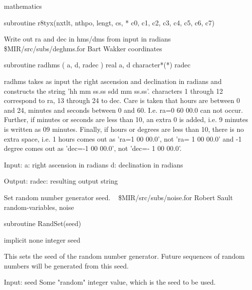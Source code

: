 \newline {} mathematics
\par{\tenpoint
{\eightpoint\begintt
      subroutine r8tyx(nxtlt, nthpo, lengt, cs,
     *                  c0, c1, c2, c3, c4, c5, c6, c7)
\endtt}
\par}
%
\noindent Write out ra and dec in hms/dms from input in radians
\newline \ 
\newline {} \$MIR/src/subs/deghms.for
\newline {} Bart Wakker
\newline {} coordinates
\par{\tenpoint
{\eightpoint\begintt
      subroutine radhms ( a, d, radec )
      real          a, d
      character*(*) radec

 radhms takes as input the right ascension and declination in radians and
 constructs the string 'hh mm ss.ss sdd mm ss.ss'.
 characters 1 through 12 correspond to ra, 13 through 24 to dec.
 Care is taken that hours are between 0 and 24, minutes and seconds between
 0 and 60. I.e. ra=0 60 00.0 can not occur.
 Further, if minutes or seconds are less than 10, an extra 0 is added, i.e.
 9 minutes is written as 09 minutes.
 Finally, if hours or degrees are less than 10, there is no extra space, i.e.
 1 hours comes out as 'ra=1 00 00.0', not 'ra= 1 00 00.0' and -1 degree comes
 out as 'dec=-1 00 00.0', not 'dec=- 1 00 00.0'.

 Input:
   a:     right ascension in radians
   d:     declination in radians

 Output:
   radec: resulting output string
\endtt}
\par}
%
\noindent Set random number generator seed.
\newline \ 
\newline {} \$MIR/src/subs/noise.for
\newline {} Robert Sault
\newline \abox{Keywords:} random-variables, noise
\par{\tenpoint
{\eightpoint\begintt
        subroutine RandSet(seed)

        implicit none
        integer seed

  This sets the seed of the random number generator. Future sequences
  of random numbers will be generated from this seed.

  Input:
    seed       Some "random" integer value, which is the seed to be
               used.
\endtt}
\par}
